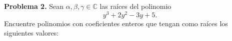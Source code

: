 \textbf{Problema 2.} Sean $\alpha,\beta,\gamma\in\mathbb{C}$ las raíces del polinomio
\[
y^3 + 2y^2 - 3y + 5.
\]
Encuentre polinomios con coeficientes enteros que tengan como raíces los siguientes valores:
